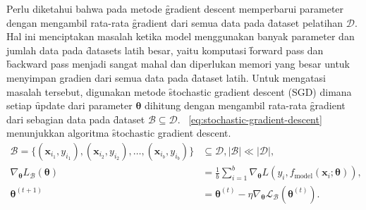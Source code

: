     Perlu diketahui bahwa pada metode \f{gradient descent} memperbarui parameter dengan mengambil rata-rata \f{gradient} dari semua data pada \f{dataset} pelatihan $\mathcal{D}$. Hal ini menciptakan masalah ketika model menggunakan banyak parameter dan jumlah data pada \f{datasets} latih besar, yaitu komputasi \f{forward pass} dan \f{backward pass} menjadi sangat mahal dan diperlukan memori yang besar untuk menyimpan gradien dari semua data pada \f{dataset} latih. Untuk mengatasi masalah tersebut, digunakan metode \f{stochastic gradient descent} (SGD) dimana setiap \f{update} dari parameter $\bm{\theta}$ dihitung dengan mengambil rata-rata \f{gradient} dari sebagian data pada \f{dataset} $\mathcal{B}\subseteq\mathcal{D}$. \equ~\ref{eq:stochastic-gradient-descent} menunjukkan algoritma \f{stochastic gradient descent}.
    \begin{align}
        \mathcal{B} = \{(\mathbf{x}_{i_1}, y_{i_1}), (\mathbf{x}_{i_2}, y_{i_2}), \dots, (\mathbf{x}_{i_b}, y_{i_b})\} &\subseteq \mathcal{D}, \mid \mathcal{B} \mid \ll \mid \mathcal{D} \mid, \\
        \label{eq:stochastic-gradient-descent-approx}
        \nabla_{\bm{\theta}}{L_\mathcal{B}}(\bm{\theta}) &= 
         \frac{1}{b} \sum_{i=1}^{b} \nabla_{\bm{\theta}} L(y_{i}, f_{\text{model}}(\mathbf{x}_{i}; \bm{\theta})), \\
        \label{eq:stochastic-gradient-descent}
        \bm{\theta}^{(t+1)} &= \bm{\theta}^{(t)} - \eta \nabla_{\bm{\theta}} \mathcal{L_B}(\bm{\theta}^{(t)}).
    \end{align}

